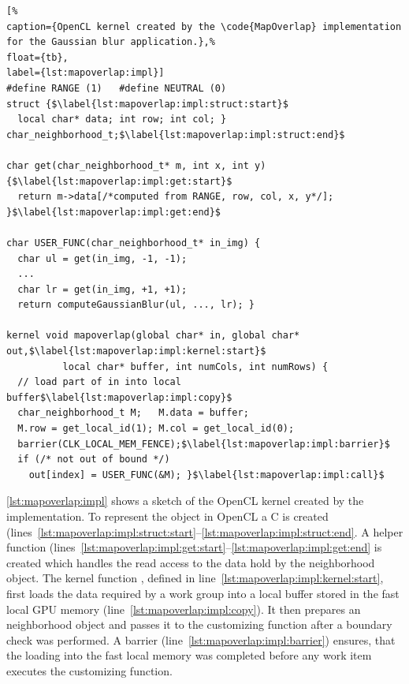 \begin{lstlisting}[%
caption={OpenCL kernel created by the \code{MapOverlap} implementation for the Gaussian blur application.},%
float={tb},
label={lst:mapoverlap:impl}]
#define RANGE (1)   #define NEUTRAL (0)
struct {$\label{lst:mapoverlap:impl:struct:start}$
  local char* data; int row; int col; } char_neighborhood_t;$\label{lst:mapoverlap:impl:struct:end}$

char get(char_neighborhood_t* m, int x, int y) {$\label{lst:mapoverlap:impl:get:start}$
  return m->data[/*computed from RANGE, row, col, x, y*/]; }$\label{lst:mapoverlap:impl:get:end}$

char USER_FUNC(char_neighborhood_t* in_img) {
  char ul = get(in_img, -1, -1);
  ...
  char lr = get(in_img, +1, +1);
  return computeGaussianBlur(ul, ..., lr); }

kernel void mapoverlap(global char* in, global char* out,$\label{lst:mapoverlap:impl:kernel:start}$
          local char* buffer, int numCols, int numRows) {
  // load part of in into local buffer$\label{lst:mapoverlap:impl:copy}$
  char_neighborhood_t M;   M.data = buffer;
  M.row = get_local_id(1); M.col = get_local_id(0);
  barrier(CLK_LOCAL_MEM_FENCE);$\label{lst:mapoverlap:impl:barrier}$
  if (/* not out of bound */)
    out[index] = USER_FUNC(&M); }$\label{lst:mapoverlap:impl:call}$
\end{lstlisting}

\autoref{lst:mapoverlap:impl} shows a sketch of the OpenCL kernel created by the  implementation.
To represent the  object in OpenCL a C  is created (lines~\ref{lst:mapoverlap:impl:struct:start}--\ref{lst:mapoverlap:impl:struct:end}.
A helper function  (lines~\ref{lst:mapoverlap:impl:get:start}--\ref{lst:mapoverlap:impl:get:end} is created which handles the read access to the data hold by the neighborhood object.
The kernel function , defined in line~\ref{lst:mapoverlap:impl:kernel:start}, first loads the data required by a work group into a local buffer stored in the fast local GPU memory (line~\ref{lst:mapoverlap:impl:copy}).
It then prepares an neighborhood object and passes it to the customizing function after a boundary check was performed.
A barrier (line~\ref{lst:mapoverlap:impl:barrier}) ensures, that the loading into the fast local memory was completed before any work item executes the customizing function.

